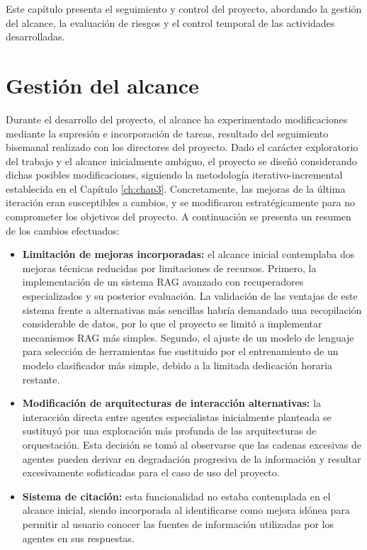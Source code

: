 Este capítulo presenta el seguimiento y control del proyecto, abordando la gestión del alcance, la evaluación de riesgos y el control temporal de las actividades desarrolladas.


\section{Gestión del alcance}
Durante el desarrollo del proyecto, el alcance ha experimentado modificaciones mediante la supresión e incorporación de tareas, resultado del seguimiento bisemanal realizado con los directores del proyecto. Dado el carácter exploratorio del trabajo y el alcance inicialmente ambiguo, el proyecto se diseñó considerando dichas posibles modificaciones, siguiendo la metodología iterativo-incremental establecida en el Capítulo \ref{ch:chap3}. Concretamente, las mejoras de la última iteración eran susceptibles a cambios, y se modificaron estratégicamente para no comprometer los objetivos del proyecto. A continuación se presenta un resumen de los cambios efectuados:

  \begin{itemize}
\item\textbf{Limitación de mejoras incorporadas: }el alcance inicial contemplaba dos mejoras técnicas reducidas por limitaciones de recursos. Primero, la implementación de un sistema RAG avanzado con recuperadores especializados y su posterior evaluación. La validación de las ventajas de este sistema frente a alternativas más sencillas habría demandado una recopilación considerable de datos, por lo que el proyecto se limitó a implementar mecanismos RAG más simples. Segundo, el ajuste de un modelo de lenguaje para selección de herramientas fue sustituido por el entrenamiento de un modelo clasificador más simple, debido a la limitada dedicación horaria restante.

\item\textbf{Modificación de arquitecturas de interacción alternativas: }la interacción directa entre agentes especialistas inicialmente planteada se sustituyó por una exploración más profunda de las arquitecturas de orquestación. Esta decisión se tomó al observarse que las cadenas excesivas de agentes pueden derivar en degradación progresiva de la información y resultar excesivamente sofisticadas para el caso de uso del proyecto.
     
  \item\textbf{Sistema de citación: }esta funcionalidad no estaba contemplada en el alcance inicial, siendo incorporada al identificarse como mejora idónea para permitir al usuario conocer las fuentes de información utilizadas por los agentes en sus respuestas.
  \end{itemize}

